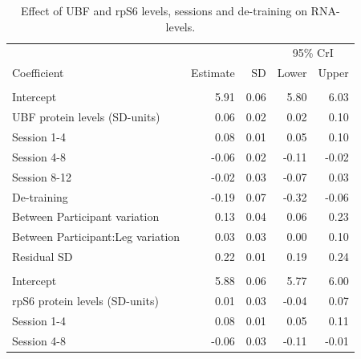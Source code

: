 \documentclass[twoside,10pt]{gihclass} %
\begin{document}
\begin{table}

\caption{\label{tab:ubf-rps6-regression-table}Effect of UBF and rpS6 levels, sessions and de-training on RNA-levels.}
\centering
\fontsize{7}{9}\selectfont
\begin{threeparttable}
\begin{tabular}[t]{lrrrr}
\toprule
\multicolumn{3}{c}{ } & \multicolumn{2}{c}{95\% CrI} \\
\cmidrule(l{3pt}r{3pt}){4-5}
Coefficient & Estimate & SD & Lower & Upper\\
\midrule
\addlinespace[0.3em]
\multicolumn{5}{l}{\textbf{UBF}}\\
\hspace{1em}Intercept & 5.91 & 0.06 & 5.80 & 6.03\\
\hspace{1em}UBF protein levels (SD-units) & 0.06 & 0.02 & 0.02 & 0.10\\
\hspace{1em}Session 1-4 & 0.08 & 0.01 & 0.05 & 0.10\\
\hspace{1em}Session 4-8 & -0.06 & 0.02 & -0.11 & -0.02\\
\hspace{1em}Session 8-12 & -0.02 & 0.03 & -0.07 & \vphantom{1}0.03\\
\hspace{1em}De-training & -0.19 & 0.07 & -0.32 & -0.06\\
\hspace{1em}Between Participant variation & 0.13 & 0.04 & 0.06 & 0.23\\
\hspace{1em}Between Participant:Leg variation & 0.03 & 0.03 & 0.00 & 0.10\\
\hspace{1em}Residual SD & 0.22 & 0.01 & 0.19 & 0.24\\
\addlinespace[0.3em]
\multicolumn{5}{l}{\textbf{rpS6}}\\
\hspace{1em}Intercept & 5.88 & 0.06 & 5.77 & 6.00\\
\hspace{1em}rpS6 protein levels (SD-units) & 0.01 & 0.03 & -0.04 & 0.07\\
\hspace{1em}Session 1-4 & 0.08 & 0.01 & 0.05 & 0.11\\
\hspace{1em}Session 4-8 & -0.06 & 0.03 & -0.11 & -0.01\\

\end{tabular}
\end{threeparttable}
\end{table}
\end{document}
